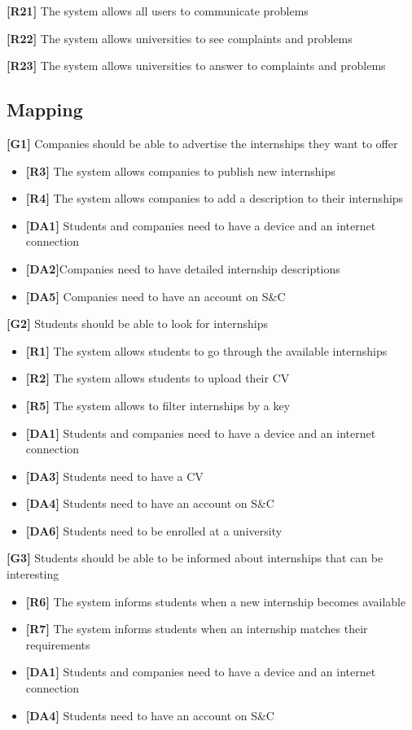 \textbf{[R21]} The system allows all users to communicate problems

\textbf{[R22]} The system allows universities to see complaints and problems

\textbf{[R23]} The system allows universities to answer to complaints and problems


\subsection{Mapping}

\textbf{[G1]} Companies should be able to advertise the internships they want to offer 
\begin{itemize}
    \item \textbf{[R3]} The system allows companies to publish new internships
    \item \textbf{[R4]} The system allows companies to add a description to their internships
    
    \item \textbf{[DA1]} Students and companies need to have a device and an internet connection
    \item \textbf{[DA2]}Companies need to have detailed internship descriptions
    \item \textbf{[DA5]} Companies need to have an account on S\&C
\end{itemize}

\textbf{[G2]} Students should be able to look for internships
\begin{itemize}
    \item \textbf{[R1]} The system allows students to go through the available internships
    \item \textbf{[R2]} The system allows students to upload their CV
    \item \textbf{[R5]} The system allows to filter internships by a key
    
    \item \textbf{[DA1]} Students and companies need to have a device and an internet connection
    \item \textbf{[DA3]} Students need to have a CV
    \item \textbf{[DA4]} Students need to have an account on S\&C
    \item \textbf{[DA6]} Students need to be enrolled at a university
\end{itemize}

\textbf{[G3]} Students should be able to be informed about internships that can be interesting
\begin{itemize}
    
    \item \textbf{[R6]} The system informs students when a new internship becomes available
    \item \textbf{[R7]} The system informs students when an internship matches their requirements

    \item \textbf{[DA1]} Students and companies need to have a device and an internet
    connection
    \item \textbf{[DA4]} Students need to have an account on S\&C
\end{itemize}

